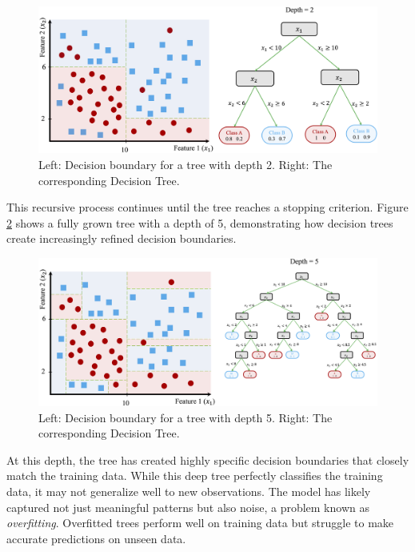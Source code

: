 \documentclass[
  11pt,
]{book}
\theoremstyle{definition}
\theoremstyle{definition}
\theoremstyle{definition}
\theoremstyle{definition}
\theoremstyle{remark}
\begin{document}
\begin{figure}[H]

{\centering \includegraphics[width=1\linewidth]{images/ch11_ex_tree_3} 

}

\caption{Left: Decision boundary for a tree with depth 2. Right: The corresponding Decision Tree.}\label{fig:tree-3}
\end{figure}

This recursive process continues until the tree reaches a stopping criterion. Figure \ref{fig:tree-4} shows a fully grown tree with a depth of 5, demonstrating how decision trees create increasingly refined decision boundaries.

\begin{figure}[H]

{\centering \includegraphics[width=1\linewidth]{images/ch11_ex_tree_4} 

}

\caption{Left: Decision boundary for a tree with depth 5. Right: The corresponding Decision Tree.}\label{fig:tree-4}
\end{figure}

At this depth, the tree has created highly specific decision boundaries that closely match the training data. While this deep tree perfectly classifies the training data, it may not generalize well to new observations. The model has likely captured not just meaningful patterns but also noise, a problem known as \emph{overfitting}. Overfitted trees perform well on training data but struggle to make accurate predictions on unseen data.
\end{document}
